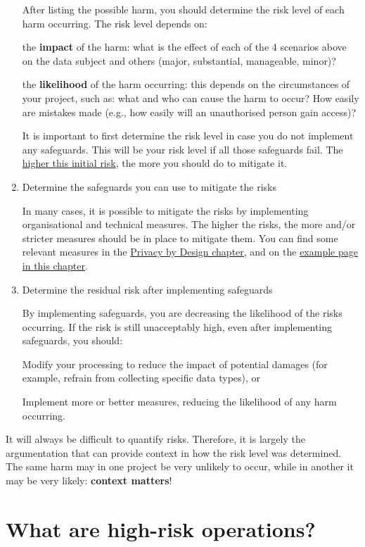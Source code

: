 \documentclass[
]{book}
\begin{document}
\begin{enumerate}
  After listing the possible harm, you should determine the risk level of
  each harm occurring. The risk level depends on:

  the \textbf{impact} of the harm: what is the effect of each of the 4 scenarios
  above on the data subject and others (major, substantial, manageable, minor)?

  the \textbf{likelihood} of the harm occurring: this depends on the
  circumstances of your project, such as: what and who can cause the harm to
  occur? How easily are mistakes made (e.g., how easily will an unauthorised
  person gain access)?

  It is important to first determine the risk level in case you do not implement
  any safeguards. This will be your risk level if all those safeguards fail.
  The \protect\hyperlink{high-risk-processing}{higher this initial risk}, the more you should do to
  mitigate it.
\item
  Determine the safeguards you can use to mitigate the
  risks

  In many cases, it is possible to mitigate the risks by implementing
  organisational and technical measures. The higher the risks, the more and/or
  stricter measures should be in place to mitigate them. You can find some
  relevant measures in the \protect\hyperlink{privacy-design-strategies}{Privacy by Design chapter},
  and on the \protect\hyperlink{example-risks}{example page in this chapter}.
\item
  Determine the residual risk after implementing
  safeguards

  By implementing safeguards, you are decreasing the likelihood of the risks
  occurring. If the risk is still unacceptably high, even after implementing
  safeguards, you should:

  Modify your processing to reduce the impact of potential damages (for
  example, refrain from collecting specific data types), or

  Implement more or better measures, reducing the likelihood of any harm
  occurring.
\end{enumerate}

It will always be difficult to quantify risks. Therefore, it is largely the
argumentation that can provide context in how the risk level was determined.
The same harm may in one project be very unlikely to occur, while in another
it may be very likely: \textbf{context matters}!

\hypertarget{high-risk-processing}{%
\section{What are high-risk operations?}\label{high-risk-processing}}
\end{document}
